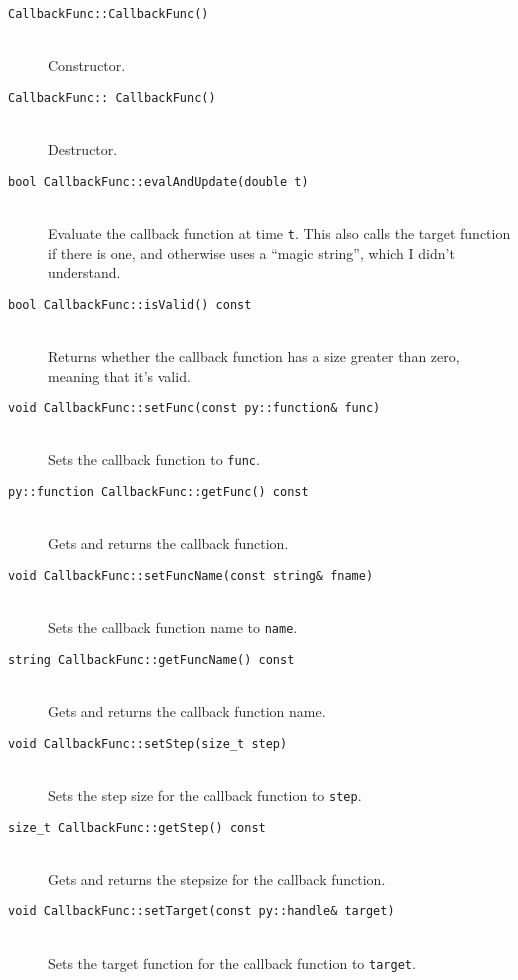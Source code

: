 \documentclass {scrbook}
\newcommand {\ttt} {\texttt}
\begin{document}
\begin{description}

\item[\ttt{CallbackFunc::CallbackFunc()}]
\hfill \\
Constructor.

\item[\ttt{CallbackFunc::~CallbackFunc()}]
\hfill \\
Destructor.

\item[\ttt{bool CallbackFunc::evalAndUpdate(double t)}]
\hfill \\
Evaluate the callback function at time \ttt{t}. This also calls the target function if there is one, and otherwise uses a ``magic string'', which I didn't understand.

\item[\ttt{bool CallbackFunc::isValid() const}]
\hfill \\
Returns whether the callback function has a size greater than zero, meaning that it's valid.

\item[\ttt{void CallbackFunc::setFunc(const py::function\& func)}]
\hfill \\
Sets the callback function to \ttt{func}.

\item[\ttt{py::function CallbackFunc::getFunc() const}]
\hfill \\
Gets and returns the callback function.

\item[\ttt{void CallbackFunc::setFuncName(const string\& fname)}]
\hfill \\
Sets the callback function name to \ttt{name}.

\item[\ttt{string CallbackFunc::getFuncName() const}]
\hfill \\
Gets and returns the callback function name.

\item[\ttt{void CallbackFunc::setStep(size\_t step)}]
\hfill \\
Sets the step size for the callback function to \ttt{step}.

\item[\ttt{size\_t CallbackFunc::getStep() const}]
\hfill \\
Gets and returns the stepsize for the callback function.

\item[\ttt{void CallbackFunc::setTarget(const py::handle\& target)}]
\hfill \\
Sets the target function for the callback function to \ttt{target}.


\end{description}
\end{document}

